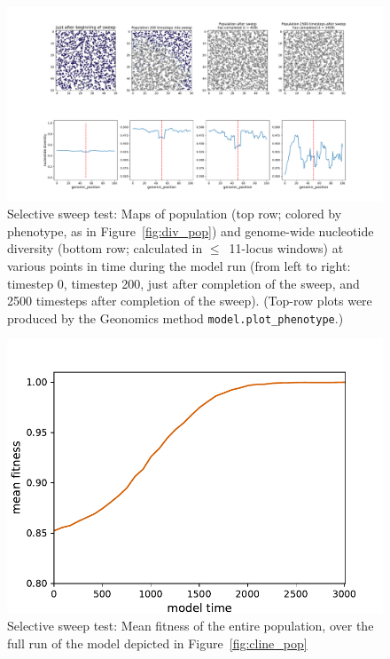 ﻿\documentclass{article}
\begin{document}
\begin{figure}[ht!]
        \includegraphics[width=175mm]{./img/final/SWEEP_pop_and_nuc_div.pdf}
        \caption{Selective sweep test: Maps of population (top row;
                 colored by phenotype, as in Figure~\ref{fig:div_pop})
                 and genome-wide nucleotide diversity
                 (bottom row; calculated in $\leq$~11-locus windows)
                 at various points in time during the model run
                 (from left to right: timestep 0, 
                 timestep 200, just after completion of the sweep,
                 and 2500 timesteps after completion of the sweep).
                 (Top-row plots were produced by the Geonomics method
                 \texttt{model.plot\_phenotype}.)}
       \label{fig:sweep_pop_and_nuc_div}
\end{figure}



\begin{figure}[ht!]
        \includegraphics[width=150mm]{./img/final/SWEEP_mean_fit.pdf}
        \caption{Selective sweep test: Mean fitness of the entire
                 population, over the full run of the model
                 depicted in Figure~\ref{fig:cline_pop}}
        \label{fig:sweep_fit}
\end{figure}
\end{document}
